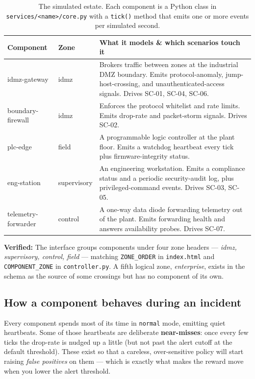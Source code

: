 \documentclass[11pt]{article}
\newcommand{\code}[1]{\texttt{\small #1}}
\newcommand{\file}[1]{\textcolor{mfpurple}{\texttt{\small #1}}}
\newcommand{\keyfact}[1]{%
  \par\vspace{4pt}\noindent
  \colorbox{panel}{\parbox{\dimexpr\linewidth-2\fboxsep}{\small\textbf{\textcolor{mfcyan}{Verified:}} #1}}%
  \par\vspace{4pt}}
\begin{document}
\begin{table}[h]
\centering
\caption{The simulated estate. Each component is a Python class in
\file{services/<name>/core.py} with a \code{tick()} method that emits one or
more events per simulated second.}
\label{tab:components}
\small
\begin{tabular}{p{3.0cm} p{2.0cm} p{8.3cm}}
\toprule
\textbf{Component} & \textbf{Zone} & \textbf{What it models \& which scenarios touch it}\\
\midrule
idmz-gateway & idmz
  & Brokers traffic between zones at the industrial DMZ boundary. Emits
    protocol-anomaly, jump-host-crossing, and unauthenticated-access signals.
    Drives SC-01, SC-04, SC-06.\\
boundary-firewall & idmz
  & Enforces the protocol whitelist and rate limits. Emits drop-rate and
    packet-storm signals. Drives SC-02.\\
plc-edge & field
  & A programmable logic controller at the plant floor. Emits a watchdog
    heartbeat every tick plus firmware-integrity status.\\
eng-station & supervisory
  & An engineering workstation. Emits a compliance status and a periodic
    security-audit log, plus privileged-command events. Drives SC-03, SC-05.\\
telemetry-forwarder & control
  & A one-way data diode forwarding telemetry out of the plant. Emits forwarding
    health and answers availability probes. Drives SC-07.\\
\bottomrule
\end{tabular}
\end{table}

\keyfact{The interface groups components under four zone headers --- \emph{idmz,
supervisory, control, field} --- matching \code{ZONE\_ORDER} in \file{index.html}
and \code{COMPONENT\_ZONE} in \file{controller.py}. A fifth logical zone,
\emph{enterprise}, exists in the schema as the source of some crossings but has
no component of its own.}

\subsection{How a component behaves during an incident}

Every component spends most of its time in \code{normal} mode, emitting quiet
heartbeats. Some of those heartbeats are deliberate \textbf{near-misses}: once
every few ticks the drop-rate is nudged up a little (but not past the alert
cutoff at the default threshold). These exist so that a careless, over-sensitive
policy will start raising \emph{false positives} on them --- which is exactly
what makes the reward move when you lower the alert threshold.
\end{document}
